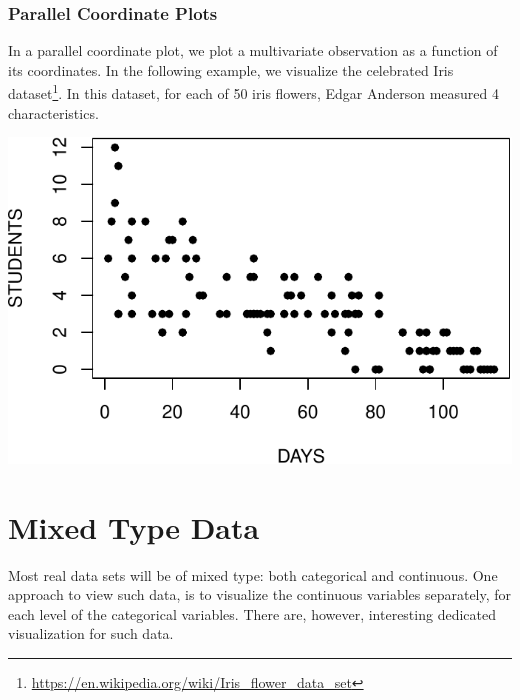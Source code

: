 \documentclass[]{book}
\newenvironment{Shaded}{\begin{snugshade}}{\end{snugshade}}
\newcommand{\DataTypeTok}[1]{\textcolor[rgb]{0.13,0.29,0.53}{#1}}
\newcommand{\DecValTok}[1]{\textcolor[rgb]{0.00,0.00,0.81}{#1}}
\newcommand{\KeywordTok}[1]{\textcolor[rgb]{0.13,0.29,0.53}{\textbf{#1}}}
\newcommand{\NormalTok}[1]{#1}
\newcommand{\OperatorTok}[1]{\textcolor[rgb]{0.81,0.36,0.00}{\textbf{#1}}}
\newcommand{\StringTok}[1]{\textcolor[rgb]{0.31,0.60,0.02}{#1}}
\renewcommand{\href}[2]{#2\footnote{\url{#1}}}
\theoremstyle{definition}
\theoremstyle{definition}
\theoremstyle{definition}
\theoremstyle{remark}
\begin{document}
\hypertarget{parcoord}{%
\subsubsection{Parallel Coordinate Plots}\label{parcoord}}

In a parallel coordinate plot, we plot a multivariate observation as a function of its coordinates.
In the following example, we visualize the celebrated \href{https://en.wikipedia.org/wiki/Iris_flower_data_set}{Iris dataset}.
In this dataset, for each of 50 iris flowers, Edgar Anderson measured 4 characteristics.

\begin{Shaded}
\end{Shaded}

\includegraphics[width=0.5\linewidth]{Rcourse_files/figure-latex/unnamed-chunk-143-1}

\hypertarget{mixed-type-data}{%
\section{Mixed Type Data}\label{mixed-type-data}}

Most real data sets will be of mixed type: both categorical and continuous.
One approach to view such data, is to visualize the continuous variables separately, for each level of the categorical variables.
There are, however, interesting dedicated visualization for such data.
\end{document}
